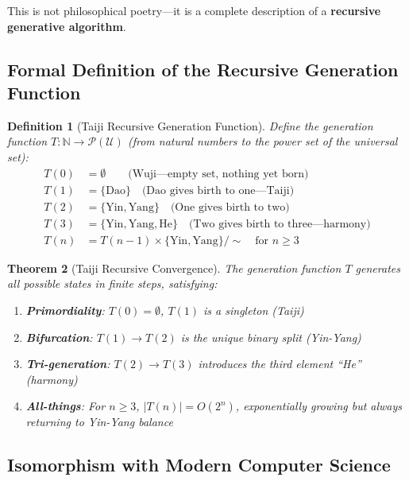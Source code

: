 \documentclass[conference]{IEEEtran}
\newtheorem{theorem}{Theorem}[section]
\newtheorem{definition}[theorem]{Definition}
\theoremstyle{remark}
\newcommand{\N}{\mathbb{N}}
\newcommand{\Pcal}{\mathcal{P}}
\begin{document}
This is not philosophical poetry---it is a complete description of a \textbf{recursive generative algorithm}.

\subsection{Formal Definition of the Recursive Generation Function}

\begin{definition}[Taiji Recursive Generation Function]
Define the generation function $T: \N \to \Pcal(\mathcal{U})$ (from natural numbers to the power set of the universal set):
\begin{align*}
T(0) &= \emptyset \qquad\text{(Wuji---empty set, nothing yet born)}\\
T(1) &= \{\text{Dao}\} \quad\text{(Dao gives birth to one---Taiji)}\\
T(2) &= \{\text{Yin}, \text{Yang}\} \quad\text{(One gives birth to two)}\\
T(3) &= \{\text{Yin}, \text{Yang}, \text{He}\} \quad\text{(Two gives birth to three---harmony)}\\
T(n) &= T(n-1) \times \{\text{Yin}, \text{Yang}\} / \sim \quad\text{for } n \ge 3
\end{align*}
\end{definition}

\begin{theorem}[Taiji Recursive Convergence]
The generation function $T$ generates all possible states in finite steps, satisfying:
\begin{enumerate}[nosep]
\item \textbf{Primordiality}: $T(0)=\emptyset$, $T(1)$ is a singleton (Taiji)
\item \textbf{Bifurcation}: $T(1)\to T(2)$ is the unique binary split (Yin-Yang)
\item \textbf{Tri-generation}: $T(2)\to T(3)$ introduces the third element ``He'' (harmony)
\item \textbf{All-things}: For $n\ge 3$, $|T(n)| = O(2^n)$, exponentially growing but always returning to Yin-Yang balance
\end{enumerate}
\end{theorem}

\subsection{Isomorphism with Modern Computer Science}
\end{document}
